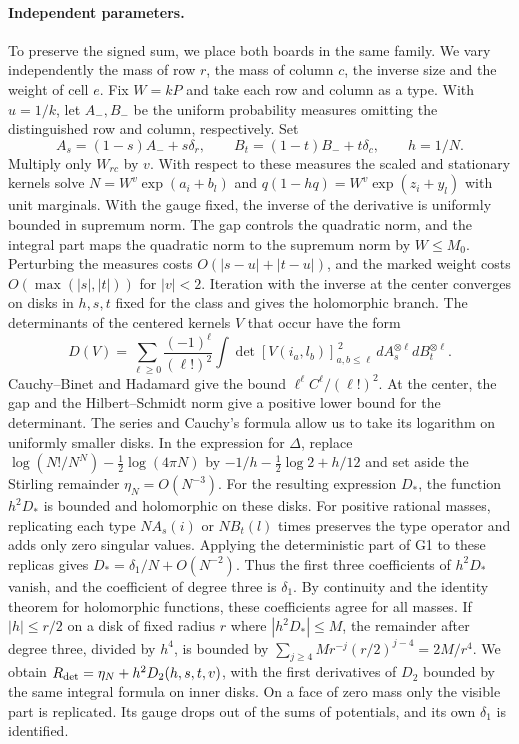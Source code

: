 \paragraph{Independent parameters.}
To preserve the signed sum, we place both boards in the same family. We vary independently the
mass of row $r$, the mass of column $c$, the inverse size and the weight of cell $e$. Fix $W=kP$
and take each row and column as a type. With $u=1/k$, let $A_-,B_-$ be the uniform probability
measures omitting the distinguished row and column, respectively. Set
\[
  A_s=(1-s)A_-+s\delta_r,\qquad B_t=(1-t)B_-+t\delta_c,\qquad h=1/N .
\]
Multiply only $W_{rc}$ by $v$. With respect to these measures the scaled and stationary kernels
solve $N=W^v\exp(a_i+b_l)$ and $q(1-hq)=W^v\exp(z_i+y_l)$ with unit marginals. With the gauge
fixed, the inverse of the derivative is uniformly bounded in supremum norm. The gap controls the
quadratic norm, and the integral part maps the quadratic norm to the supremum norm by $W\le M_0$.
Perturbing the measures costs $O(|s-u|+|t-u|)$, and the marked weight costs $O(\max(|s|,|t|))$ for
$|v|<2$. Iteration with the inverse at the center converges on disks in $h,s,t$ fixed for the
class and gives the holomorphic branch. The determinants of the centered kernels $V$ that occur
have the form
\[
 D(V)=\sum_{\ell\ge0}\frac{(-1)^\ell}{(\ell!)^2}
  \int\det[V(i_a,l_b)]_{a,b\le\ell}^{\,2}\,
               dA_s^{\otimes\ell}dB_t^{\otimes\ell}.
\]
Cauchy--Binet and Hadamard give the bound $\ell^\ell C^\ell/(\ell!)^2$. At the center, the gap and
the Hilbert--Schmidt norm give a positive lower bound for the determinant. The series and Cauchy's
formula allow us to take its logarithm on uniformly smaller disks. In the expression for $\Delta$,
replace $\log(N!/N^N)-\frac12\log(4\pi N)$ by $-1/h-\frac12\log2+h/12$ and set aside the Stirling
remainder $\eta_N=O(N^{-3})$. For the resulting expression $D_*$, the function $h^2D_*$ is bounded
and holomorphic on these disks. For positive rational masses, replicating each type $N A_s(i)$ or
$N B_t(l)$ times preserves the type operator and adds only zero singular values. Applying the
deterministic part of G1 to these replicas gives $D_*=\delta_1/N+O(N^{-2})$. Thus the first three
coefficients of $h^2D_*$ vanish, and the coefficient of degree three is $\delta_1$. By continuity
and the identity theorem for holomorphic functions, these coefficients agree for all masses. If
$|h|\le r/2$ on a disk of fixed radius $r$ where $|h^2D_*|\le M$, the remainder after degree
three, divided by $h^4$, is bounded by $\sum_{j\ge4}Mr^{-j}(r/2)^{j-4}=2M/r^4$. We obtain $R_{\rm
det}=\eta_N+h^2D_2(h,s,t,v)$, with the first derivatives of $D_2$ bounded by the same integral
formula on inner disks. On a face of zero mass only the visible part is replicated. Its gauge
drops out of the sums of potentials, and its own $\delta_1$ is identified.

